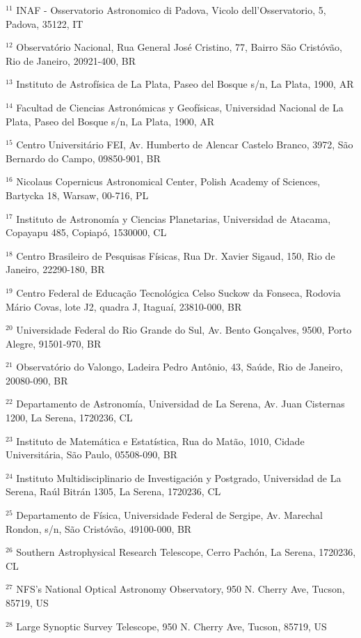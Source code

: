 \noindent
$^{11}$ INAF - Osservatorio Astronomico di Padova, Vicolo dell'Osservatorio, 5, Padova, 35122, IT

\noindent
$^{12}$ Observatório Nacional, Rua General José Cristino, 77, Bairro São Cristóvão, Rio de Janeiro, 20921-400, BR

\noindent
$^{13}$ Instituto de Astrofísica de La Plata, Paseo del Bosque s/n, La Plata, 1900, AR

\noindent
$^{14}$ Facultad de Ciencias Astronómicas y Geofísicas, Universidad Nacional de La Plata, Paseo del Bosque s/n, La Plata, 1900, AR

\noindent
$^{15}$ Centro Universitário FEI, Av. Humberto de Alencar Castelo Branco, 3972, São Bernardo do Campo, 09850-901, BR

\noindent
$^{16}$ Nicolaus Copernicus Astronomical Center, Polish Academy of Sciences, Bartycka 18, Warsaw, 00-716, PL

\noindent
$^{17}$ Instituto de Astronomía y Ciencias Planetarias, Universidad de Atacama, Copayapu 485, Copiapó, 1530000, CL

\noindent
$^{18}$ Centro Brasileiro de Pesquisas Físicas, Rua Dr. Xavier Sigaud, 150, Rio de Janeiro, 22290-180, BR

\noindent
$^{19}$ Centro Federal de Educação Tecnológica Celso Suckow da Fonseca, Rodovia Mário Covas, lote J2, quadra J, Itaguaí, 23810-000, BR

\noindent
$^{20}$ Universidade Federal do Rio Grande do Sul, Av. Bento Gonçalves, 9500, Porto Alegre, 91501-970, BR

\noindent
$^{21}$ Observatório do Valongo, Ladeira Pedro Antônio, 43, Saúde, Rio de Janeiro, 20080-090, BR

\noindent
$^{22}$ Departamento de Astronomía, Universidad de La Serena, Av. Juan Cisternas 1200, La Serena, 1720236, CL

\noindent
$^{23}$ Instituto de Matemática e Estatística, Rua do Matão, 1010, Cidade Universitária, São Paulo, 05508-090, BR

\noindent
$^{24}$ Instituto Multidisciplinario de Investigación y Postgrado, Universidad de La Serena, Raúl Bitrán 1305, La Serena, 1720236, CL

\noindent
$^{25}$ Departamento de Física, Universidade Federal de Sergipe, Av. Marechal Rondon, s/n, São Cristóvão, 49100-000, BR

\noindent
$^{26}$ Southern Astrophysical Research Telescope, Cerro Pachón, La Serena, 1720236, CL

\noindent
$^{27}$ NFS's National Optical Astronomy Observatory, 950 N. Cherry Ave, Tucson, 85719, US

\noindent
$^{28}$ Large Synoptic Survey Telescope, 950 N. Cherry Ave, Tucson, 85719, US
